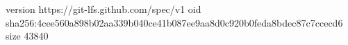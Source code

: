 version https://git-lfs.github.com/spec/v1
oid sha256:4cee560a898b02aa339b040ce41b087ee9aa8d0c920b0feda8bdec87c7ccecd6
size 43840
